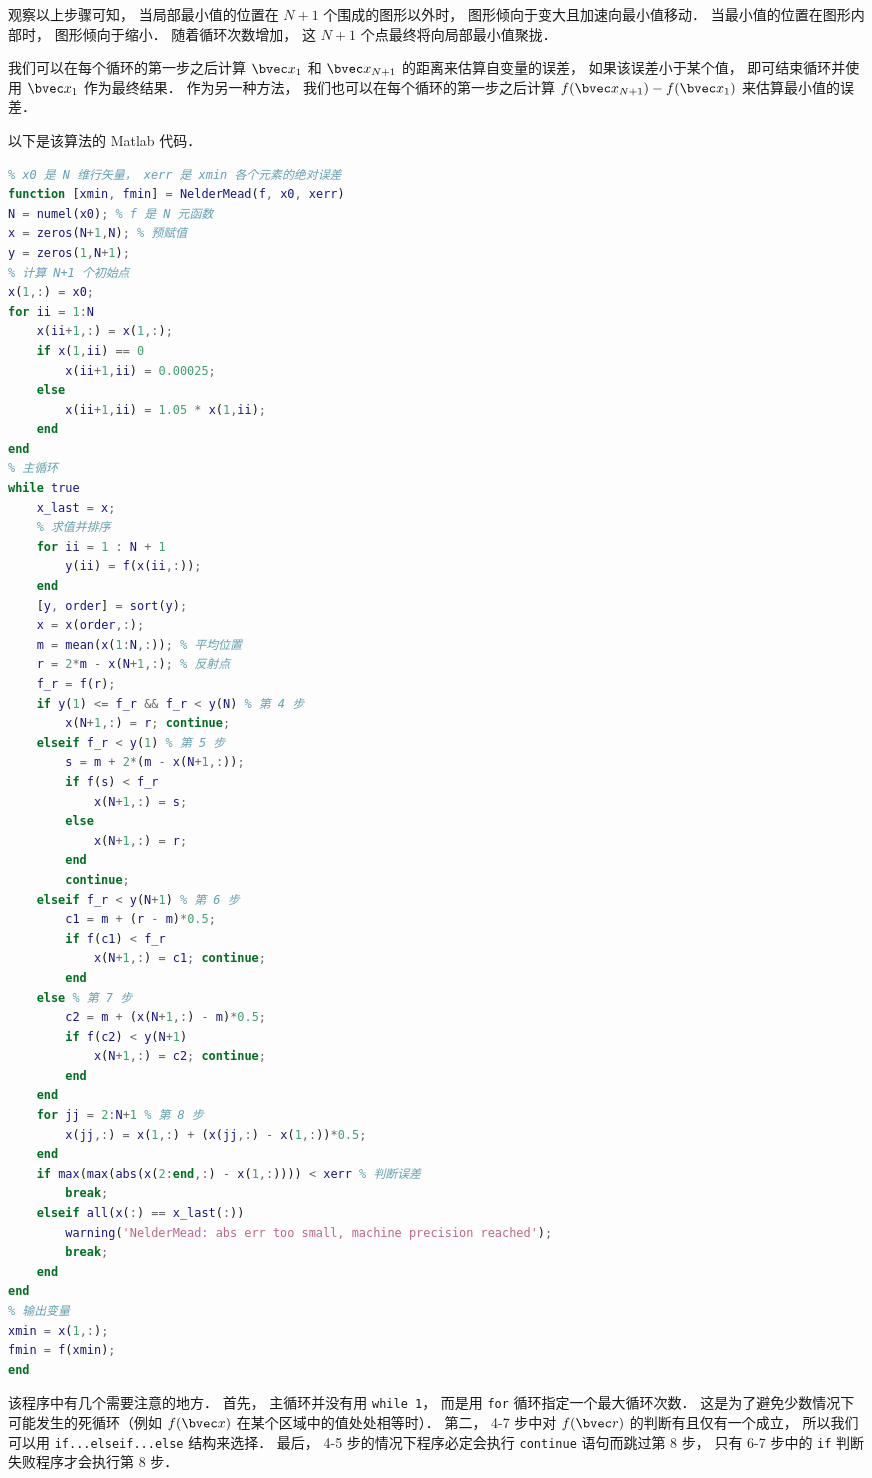 观察以上步骤可知， 当局部最小值的位置在 $N+1$ 个围成的图形以外时， 图形倾向于变大且加速向最小值移动． 当最小值的位置在图形内部时， 图形倾向于缩小． 随着循环次数增加， 这 $N+1$ 个点最终将向局部最小值聚拢． 

我们可以在每个循环的第一步之后计算 $\bvec x_1$ 和 $\bvec x_{N+1}$ 的距离来估算自变量的误差， 如果该误差小于某个值， 即可结束循环并使用 $\bvec x_1$ 作为最终结果． 作为另一种方法， 我们也可以在每个循环的第一步之后计算 $f(\bvec x_{N+1}) - f(\bvec x_1)$ 来估算最小值的误差．

以下是该算法的 Matlab 代码．

\begin{lstlisting}[language=matlab, caption=NelderMead.m]
% f 是函数句柄，只接受一个 N 维行矢量作为输入变量， 并返回一个函数值
% x0 是 N 维行矢量， xerr 是 xmin 各个元素的绝对误差
function [xmin, fmin] = NelderMead(f, x0, xerr)
N = numel(x0); % f 是 N 元函数
x = zeros(N+1,N); % 预赋值
y = zeros(1,N+1);
% 计算 N+1 个初始点
x(1,:) = x0;
for ii = 1:N
    x(ii+1,:) = x(1,:);
    if x(1,ii) == 0
        x(ii+1,ii) = 0.00025;
    else
        x(ii+1,ii) = 1.05 * x(1,ii);
    end
end
% 主循环
while true
    x_last = x;
    % 求值并排序
    for ii = 1 : N + 1
        y(ii) = f(x(ii,:));
    end
    [y, order] = sort(y);
    x = x(order,:);
    m = mean(x(1:N,:)); % 平均位置
    r = 2*m - x(N+1,:); % 反射点
    f_r = f(r);
    if y(1) <= f_r && f_r < y(N) % 第 4 步
        x(N+1,:) = r; continue;
    elseif f_r < y(1) % 第 5 步
        s = m + 2*(m - x(N+1,:));
        if f(s) < f_r
            x(N+1,:) = s;
        else
            x(N+1,:) = r;
        end
        continue;
    elseif f_r < y(N+1) % 第 6 步
        c1 = m + (r - m)*0.5;
        if f(c1) < f_r
            x(N+1,:) = c1; continue;
        end
    else % 第 7 步
        c2 = m + (x(N+1,:) - m)*0.5;
        if f(c2) < y(N+1)
            x(N+1,:) = c2; continue;
        end
    end
    for jj = 2:N+1 % 第 8 步
        x(jj,:) = x(1,:) + (x(jj,:) - x(1,:))*0.5;
    end
    if max(max(abs(x(2:end,:) - x(1,:)))) < xerr % 判断误差
        break;
    elseif all(x(:) == x_last(:))
        warning('NelderMead: abs err too small, machine precision reached');
        break;
    end
end
% 输出变量
xmin = x(1,:);
fmin = f(xmin);
end
\end{lstlisting}

该程序中有几个需要注意的地方． 首先， 主循环并没有用 \verb|while 1|， 而是用 \verb|for| 循环指定一个最大循环次数． 这是为了避免少数情况下可能发生的死循环（例如 $f(\bvec x)$ 在某个区域中的值处处相等时）． 第二， 4-7 步中对 $f(\bvec r)$ 的判断有且仅有一个成立， 所以我们可以用 \verb|if...elseif...else| 结构来选择． 最后， 4-5 步的情况下程序必定会执行 \verb|continue| 语句而跳过第 8 步， 只有 6-7 步中的 \verb|if| 判断失败程序才会执行第 8 步．

